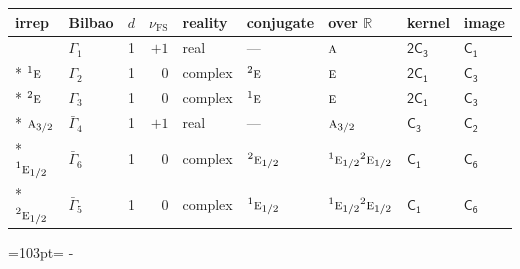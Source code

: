 \documentclass[10pt,a4paper]{article}
\makeatletter
\def\grouprule#1#2{\noalign{\marks\LTgroupmarks{\the\belowrulesep}\nobreak\vskip#1%
  \vskip\aboverulesep}\multispan\LT@cols\unskip{\leaders\hrule\@height#2\hfill\kern\z@}\cr
  \noalign{\penalty\LTrulebreak\vskip\belowrulesep\global\@lastruleclass\z@}}
\newcommand{\needspace}[1]{\par\penalty-100\begingroup\dimen0=#1\relax\dimen2=\pagegoal
  \advance\dimen2-\pagetotal\ifdim\dimen0>\dimen2\relax\ifdim\dimen2>0pt\vfil\break\fi\fi
  \endgroup}
\numberwithin{equation}{section}
\newcommand{\grp}[1]{\mathsf{#1}}
\newcommand{\irr}[1]{\text{\normalfont\scshape #1}}
\newcommand{\conjpair}[1]{{}^{#1}}
\newcommand{\detbox}[1]{{\setlength{\fboxsep}{1pt}\fbox{#1}}}
\newcommand{\fsind}{\nu_{\mathrm{FS}}}
\makeatother
\begin{document}
{\small\renewcommand{\arraystretch}{1.25}\setlength{\tabcolsep}{4pt}\begin{longtable}{@{}llrrlllll@{}}\toprule
irrep & Bilbao & $d$ & $\fsind$ & reality & conjugate & over $\mathbb{R}$ & kernel & image\\\midrule\endhead
\bottomrule\endfoot\endlastfoot
\detbox{$\irr{a}$} & $\Gamma_{1}$ & 1 & $+1$ & real & --- & $\irr{a}$ & \href{2C3.pdf}{$\grp{2C_{3}}$} & \href{../../../rotation/data/pdf/C1.pdf}{$\grp{C_{1}}$}\\*
$\conjpair{1}\irr{e}$ & $\Gamma_{2}$ & 1 & $0$ & complex & $\conjpair{2}\irr{e}$ & $\irr{e}$ & \href{2C1.pdf}{$\grp{2C_{1}}$} & \href{../../../rotation/data/pdf/C3.pdf}{$\grp{C_{3}}$}\\*
$\conjpair{2}\irr{e}$ & $\Gamma_{3}$ & 1 & $0$ & complex & $\conjpair{1}\irr{e}$ & $\irr{e}$ & \href{2C1.pdf}{$\grp{2C_{1}}$} & \href{../../../rotation/data/pdf/C3.pdf}{$\grp{C_{3}}$}\\*
\grouprule{0pt}{\lightrulewidth}
$\irr{a}_{3/2}$ & $\bar{\Gamma}_{4}$ & 1 & $+1$ & real & --- & $\irr{a}_{3/2}$ & \href{C3.pdf}{$\grp{C_{3}}$} & \href{../../../rotation/data/pdf/C2.pdf}{$\grp{C_{2}}$}\\*
$\conjpair{1}\irr{e}_{1/2}$ & $\bar{\Gamma}_{6}$ & 1 & $0$ & complex & $\conjpair{2}\irr{e}_{1/2}$ & $\conjpair{1}\irr{e}_{1/2}\conjpair{2}\irr{e}_{1/2}$ & \href{C1.pdf}{$\grp{C_{1}}$} & \href{../../../rotation/data/pdf/C6.pdf}{$\grp{C_{6}}$}\\*
$\conjpair{2}\irr{e}_{1/2}$ & $\bar{\Gamma}_{5}$ & 1 & $0$ & complex & $\conjpair{1}\irr{e}_{1/2}$ & $\conjpair{1}\irr{e}_{1/2}\conjpair{2}\irr{e}_{1/2}$ & \href{C1.pdf}{$\grp{C_{1}}$} & \href{../../../rotation/data/pdf/C6.pdf}{$\grp{C_{6}}$}\\
\bottomrule\end{longtable}}
\needspace{103pt}
\end{document}
